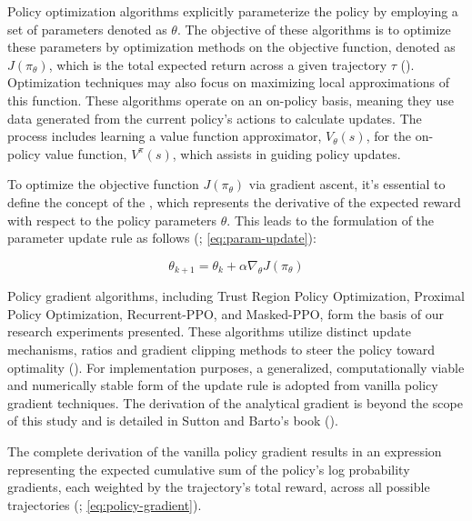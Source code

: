 \noindent Policy optimization algorithms explicitly parameterize the policy by employing a set of parameters denoted as $\theta$. The objective of these algorithms is to optimize these parameters by optimization methods on the objective function, denoted as $J(\pi_\theta)$, which is the total expected return across a given trajectory $\tau$ (\textcolor{deepblue}{\cite{SpinningUp2018}}). Optimization techniques may also focus on maximizing local approximations of this function. These algorithms operate on an on-policy basis, meaning they use data generated from the current policy's actions to calculate updates. The process includes learning a value function approximator, $V_\theta(s)$, for the on-policy value function, $V^{\pi}(s)$, which assists in guiding policy updates.

\bigskip

\noindent To optimize the objective function $J(\pi_\theta)$ via gradient ascent, it's essential to define the concept of the , which represents the derivative of the expected reward with respect to the policy parameters $\theta$. This leads to the formulation of the parameter update rule as follows (\textcolor{deepblue}{\cite{SpinningUp2018}; \autoref{eq:param-update}}):

\begin{equation}
    \theta_{k+1} = \theta_k + \alpha \nabla_{\theta} J(\pi_{\theta})
    \label{eq:param-update}
\end{equation}

\noindent Policy gradient algorithms, including Trust Region Policy Optimization, Proximal Policy Optimization, Recurrent-PPO, and Masked-PPO, form the basis of our research experiments presented. These algorithms utilize distinct update mechanisms, ratios and gradient clipping methods to steer the policy toward optimality (\textcolor{deepblue}{\cite{lehmann2024definitive}}). For implementation purposes, a generalized, computationally viable and numerically stable form of the update rule is adopted from vanilla policy gradient techniques. The derivation of the analytical gradient is beyond the scope of this study and is detailed in Sutton and Barto's book (\textcolor{deepblue}{\cite{Sutton1998}}).

\bigskip

\noindent The complete derivation of the vanilla policy gradient results in an expression representing the expected cumulative sum of the policy's log probability gradients, each weighted by the trajectory's total reward, across all possible trajectories (\textcolor{deepblue}{\cite{SpinningUp2018}; \autoref{eq:policy-gradient}}).

